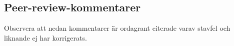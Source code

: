 %

%




\subsection{Peer-review-kommentarer}
Observera att nedan kommentarer är ordagrant citerade varav stavfel och liknande ej har korrigerats. 

